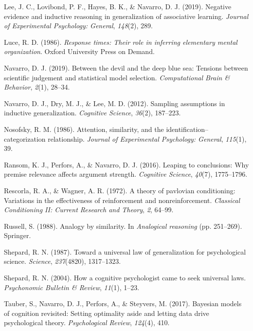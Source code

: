 \documentclass[english,doc]{apa6}
\begin{document}
\leavevmode\hypertarget{ref-lee2019negative}{}%
Lee, J. C., Lovibond, P. F., Hayes, B. K., \& Navarro, D. J. (2019). Negative evidence and inductive reasoning in generalization of associative learning. \emph{Journal of Experimental Psychology: General}, \emph{148}(2), 289.

\leavevmode\hypertarget{ref-luce1986response}{}%
Luce, R. D. (1986). \emph{Response times: Their role in inferring elementary mental organization}. Oxford University Press on Demand.

\leavevmode\hypertarget{ref-navarro2019between}{}%
Navarro, D. J. (2019). Between the devil and the deep blue sea: Tensions between scientific judgement and statistical model selection. \emph{Computational Brain \& Behavior}, \emph{2}(1), 28--34.

\leavevmode\hypertarget{ref-navarro2012sampling}{}%
Navarro, D. J., Dry, M. J., \& Lee, M. D. (2012). Sampling assumptions in inductive generalization. \emph{Cognitive Science}, \emph{36}(2), 187--223.

\leavevmode\hypertarget{ref-nosofsky1986attention}{}%
Nosofsky, R. M. (1986). Attention, similarity, and the identification--categorization relationship. \emph{Journal of Experimental Psychology: General}, \emph{115}(1), 39.

\leavevmode\hypertarget{ref-ransom2016leaping}{}%
Ransom, K. J., Perfors, A., \& Navarro, D. J. (2016). Leaping to conclusions: Why premise relevance affects argument strength. \emph{Cognitive Science}, \emph{40}(7), 1775--1796.

\leavevmode\hypertarget{ref-rescorla1972theory}{}%
Rescorla, R. A., \& Wagner, A. R. (1972). A theory of pavlovian conditioning: Variations in the effectiveness of reinforcement and nonreinforcement. \emph{Classical Conditioning II: Current Research and Theory}, \emph{2}, 64--99.

\leavevmode\hypertarget{ref-russell1988analogy}{}%
Russell, S. (1988). Analogy by similarity. In \emph{Analogical reasoning} (pp. 251--269). Springer.

\leavevmode\hypertarget{ref-shepard1987toward}{}%
Shepard, R. N. (1987). Toward a universal law of generalization for psychological science. \emph{Science}, \emph{237}(4820), 1317--1323.

\leavevmode\hypertarget{ref-shepard2004cognitive}{}%
Shepard, R. N. (2004). How a cognitive psychologist came to seek universal laws. \emph{Psychonomic Bulletin \& Review}, \emph{11}(1), 1--23.

\leavevmode\hypertarget{ref-tauber2017bayesian}{}%
Tauber, S., Navarro, D. J., Perfors, A., \& Steyvers, M. (2017). Bayesian models of cognition revisited: Setting optimality aside and letting data drive psychological theory. \emph{Psychological Review}, \emph{124}(4), 410.
\end{document}
